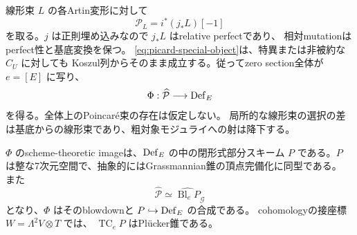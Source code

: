線形束 $L$ の各Artin変形に対して
\[
 \mathcal P_L=i^*(j_*L)[-1]
\]
を取る。$j$ は正則埋め込みなので $j_*L$ はrelative perfectであり、
相対mutationはperfect性と基底変換を保つ。
\eqref{eq:picard-special-object}は、特異または非被約な $C_U$ に対しても
Koszul列からそのまま成立する。従ってzero section全体が $e=[E]$ に写り、
\[
 \Phi:\widehat{\mathcal P}\longrightarrow\operatorname{Def}_E
\]
を得る。全体上のPoincar\'e束の存在は仮定しない。
局所的な線形束の選択の差は基底からの線形束であり、粗対象モジュライへの射は降下する。

\begin{theorem}[相対Picard像とそのblowup]\label{thm:picard-formal-image}
$\Phi$ のscheme-theoretic imageは、$\operatorname{Def}_E$ の中の閉形式部分スキーム
$P$ である。$P$ は整な7次元空間で、抽象的にはGrassmannian錐の頂点完備化に同型である。
また
\[
 \widehat{\mathcal P}\simeq
 \widehat{\operatorname{Bl}_eP}_{\mathcal G}
\]
となり、$\Phi$ はそのblowdownと $P\hookrightarrow\operatorname{Def}_E$ の合成である。
cohomologyの接座標 $W=\Lambda^2V\otimes T$ では、
$\operatorname{TC}_eP$ はPl\"ucker錐である。
\end{theorem}

